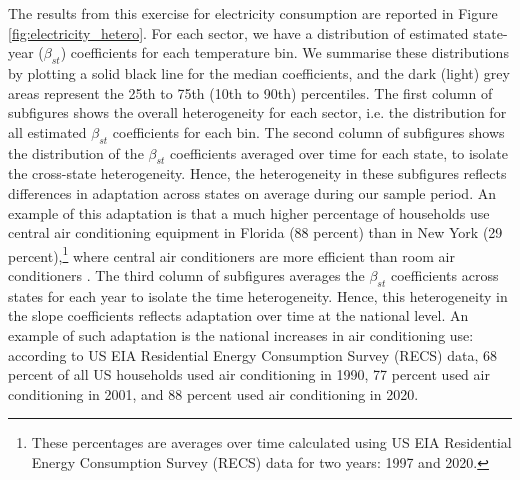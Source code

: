 \documentclass[11pt]{article}
\begin{document}
The results from this exercise for electricity consumption are reported in Figure \ref{fig:electricity_hetero}. For each sector, we have a distribution of estimated state-year ($\beta_{st}$) coefficients for each temperature bin. We summarise these distributions by plotting a solid black line for the median coefficients, and the dark (light) grey areas represent the 25th to 75th (10th to 90th) percentiles. The first column of subfigures shows the overall heterogeneity for each sector, i.e. the distribution for all estimated $\beta_{st}$ coefficients for each bin. The second column of subfigures shows the distribution of the $\beta_{st}$ coefficients averaged over time for each state, to isolate the cross-state heterogeneity. Hence, the heterogeneity in these subfigures reflects differences in adaptation across states on average during our sample period. An example of this adaptation is that a much higher percentage of households use central air conditioning equipment in Florida (88 percent) than in New York (29 percent),\footnote{ These percentages are averages over time calculated using US EIA Residential Energy Consumption Survey (RECS) data for two years: 1997 and 2020.} where central air conditioners are more efficient than room air conditioners \citep{USDOEa}. The third column of subfigures averages the $\beta_{st}$ coefficients across states for each year to isolate the time heterogeneity. Hence, this heterogeneity in the slope coefficients reflects adaptation over time at the national level. An example of such adaptation is the national increases in air conditioning use: according to US EIA Residential Energy Consumption Survey (RECS) data, 68 percent of all US households used air conditioning in 1990, 77 percent used air conditioning in 2001, and 88 percent used air conditioning in 2020. 
\end{document}
